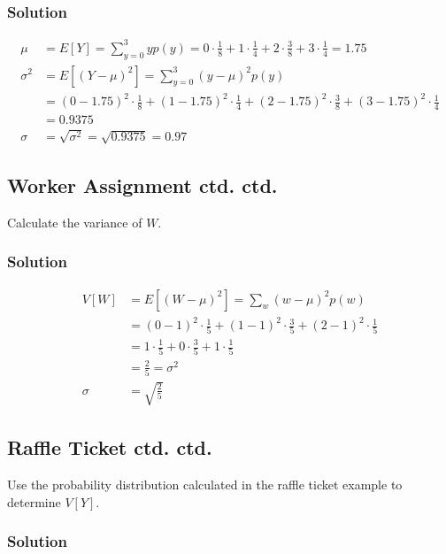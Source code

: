 \documentclass[11pt]{article}
\theoremstyle{definition}
\begin{document}
\subsubsection*{Solution}

$$
	\begin{aligned}
		\mu & = E[Y] = \sum_{y=0}^3 yp(y) = 0 \cdot \frac{1}{8} + 1 \cdot \frac{1}{4} + 2 \cdot \frac{3}{8} + 3 \cdot \frac{1}{4} = 1.75 \\
		\sigma^2 & = E[(Y-\mu)^2] = \sum_{y=0}^3 (y-\mu)^2p(y) \\
		& = (0 - 1.75)^2 \cdot \frac{1}{8} + (1 - 1.75)^2 \cdot \frac{1}{4} + (2 - 1.75)^2 \cdot \frac{3}{8} + (3 - 1.75)^2 \cdot \frac{1}{4} \\
		& = 0.9375 \\
		\sigma & = \sqrt{\sigma^2} = \sqrt{0.9375} = 0.97
	\end{aligned}
$$

\subsection{Worker Assignment ctd. ctd.}

Calculate the variance of $W$.

\subsubsection*{Solution}

$$
	\begin{aligned}
		V[W] & = E[(W - \mu)^2] = \sum_w (w-\mu)^2p(w) \\
		& = (0 - 1)^2 \cdot \frac{1}{5} + (1 - 1)^2 \cdot \frac{3}{5} + (2 - 1)^2 \cdot \frac{1}{5} \\
		& = 1 \cdot \frac{1}{5} + 0 \cdot \frac{3}{5} + 1 \cdot \frac{1}{5} \\
		& = \frac{2}{5} = \sigma^2 \\
		\sigma & = \sqrt{\frac{2}{5}}
	\end{aligned}
$$

\subsection{Raffle Ticket ctd. ctd.}

Use the probability distribution calculated in the raffle ticket example to determine $V[Y]$.

\subsubsection*{Solution}
\end{document}

